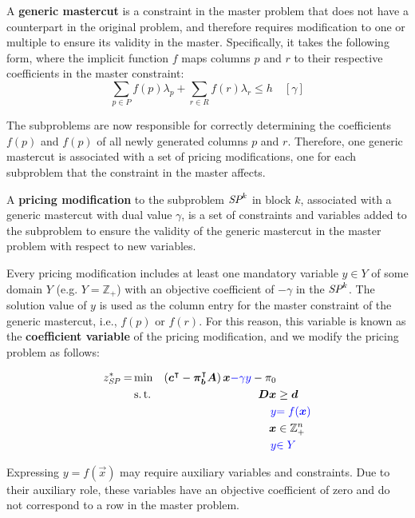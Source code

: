 \begin{definition}\label{def:gm}
A \textbf{generic mastercut} is a constraint in the master problem that does not have a counterpart in the original problem, and therefore requires modification to one or multiple \SP{} to ensure its validity in the master. Specifically, it takes the following form, where the implicit function $f$ maps columns $p$ and $r$ to their respective coefficients in the master constraint:
\begin{equation*}
\sum_{p \in P} f(p) \lambda_p + \sum_{r \in R} f(r) \lambda_r \leq h \quad \left[\gamma\right]
\end{equation*}

The subproblems are now responsible for correctly determining the coefficients $f(p)$ and $f(p)$ of all newly generated columns $p$ and $r$. Therefore, one generic mastercut is associated with a set of pricing modifications, one for each subproblem that the constraint in the master affects.
\end{definition}

\begin{definition}\label{def:gm_pricing_modification}
A \textbf{pricing modification} to the subproblem $\SP{k}$ in block $k$, associated with a generic mastercut with dual value $\gamma$, is a set of constraints and variables added to the subproblem to ensure the validity of the generic mastercut in the master problem with respect to new variables.

Every pricing modification includes at least one mandatory variable $y \in Y$ of some domain $Y$ (e.g. $Y = \mathbb{Z}_+$) with an objective coefficient of $-\gamma$ in the $\SP{k}$. The solution value of $y$ is used as the column entry for the master constraint of the generic mastercut, i.e., $f(p)$ or $f(r)$. For this reason, this variable is known as the \textbf{coefficient variable} of the pricing modification, and we modify the pricing problem as follows:

\begin{equation*}
\begin{aligned}
z^*_\SP{} = &\min & \left( \vec{c}\transpose - \vec{\pi}_\vec{b}\transpose \mat{A} \right) \vec{x} {\color{blue} - \gamma y} - \pi_0 & \\
&\st & \mat{D} \vec{x} & \geq \vec{d} \\
&& {\color{blue} y} & {\color{blue} = f(\vec{x})} \\
&& \vec{x} & \in \mathbb{Z}_+^n \\
&& {\color{blue} y} & {\color{blue} \in Y}
\end{aligned}
\end{equation*}

Expressing $y = f(\vec{x})$ may require auxiliary variables and constraints. Due to their auxiliary role, these variables have an objective coefficient of zero and do not correspond to a row in the master problem.
\end{definition}

